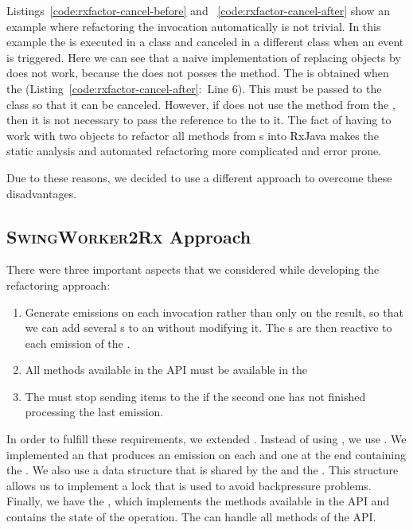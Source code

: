\documentclass[type=bsc,accentcolor=tud9c]{tudthesis}
\newcommand{\framework}[1]{\textcolor{black}{#1}}
\newcommand{\toolextension}{\textsc{SwingWorker2Rx}}
\begin{document}


Listings~\ref{code:rxfactor-cancel-before} and ~\ref{code:rxfactor-cancel-after} show an example where refactoring the  invocation automatically is not trivial. In this example the  is executed in a class and canceled in a different class when an event is triggered. Here we can see that a naive implementation of replacing  objects by  does not work, because the  does not posses the  method. The  is obtained when the  (Listing~\ref{code:rxfactor-cancel-after}:~Line 6). This  must be passed to the class  so that it can be canceled. However, if  does not use the  method from the , then it is not necessary to pass the reference to the  to it. The fact of having to work with two objects to refactor all methods from s into \framework{RxJava} makes the static analysis and automated refactoring more complicated and error prone.



Due to these reasons, we decided to use a different approach to overcome these disadvantages.
\newpage

\subsection{\toolextension{} Approach}
\label{sec:2rx-approach}
There were three important aspects that we considered while developing the refactoring approach:
\begin{enumerate}
	\item Generate emissions on each  invocation rather than only on the result, so that we can add several s to an  without modifying it. The s are then reactive to each emission of the .
	\item All methods available in the  API must be available in the 
	\item The  must stop sending items to the  if the second one has not finished processing the last emission.
\end{enumerate}

In order to fulfill these requirements, we extended . Instead of using , we use . We implemented an  that produces an emission on each  and one at the end containing the . We also use a data structure that is shared by the  and the . This structure allows us to implement a lock that is used to avoid backpressure problems. Finally, we have the , which implements the methods available in the  API and contains the state of the operation. The  can handle all methods of the  API.
\end{document}

